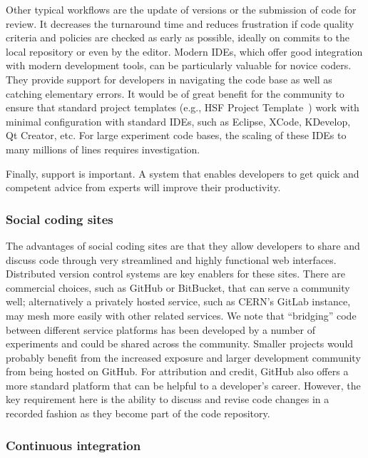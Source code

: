 \documentclass[12pt,a4paper]{article}
\begin{document}
Other typical workflows are the update of versions or the submission of
code for review. It decreases the turnaround time and reduces
frustration if code quality criteria and policies are checked as early
as possible, ideally on commits to the local repository or even by the
editor. Modern IDEs, which offer good integration with modern
development tools, can be particularly valuable for novice coders. They
provide support for developers in navigating the code base as well as
catching elementary errors. It would be of great benefit for the
community to ensure that standard project templates
(e.g., HSF Project Template~\cite{HSFProjectTemplate}) work
with minimal configuration with standard IDEs, such as Eclipse, XCode,
KDevelop, Qt Creator, etc. For large experiment code bases, the scaling
of these IDEs to many millions of lines requires investigation.

Finally, support is important. A system that enables developers to
get quick and competent advice from experts will improve their
productivity.

\hypertarget{social-coding-sites}{%
\subsubsection{Social coding sites}\label{social-coding-sites}}

The advantages of social coding sites are that they allow developers to
share and discuss code through very streamlined and highly functional
web interfaces. Distributed version control systems are key enablers for
these sites. There are commercial choices, such as GitHub or BitBucket,
that can serve a community well; alternatively a privately hosted
service, such as CERN's GitLab instance, may mesh more easily with other
related services. We note that ``bridging'' code between different service
platforms has been developed by a number of experiments and could be shared
across the community. Smaller projects would probably
benefit from the increased exposure and larger development community from being hosted on GitHub.
For attribution and credit, GitHub also offers a more standard platform
that can be helpful to a developer's career. However, the key
requirement here is the ability to discuss and revise code changes in a
recorded fashion as they become part of the code repository.

\hypertarget{continuous-integration}{%
\subsubsection{Continuous integration}\label{continuous-integration}}
\end{document}
